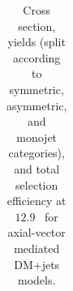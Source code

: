 \begin{table}
{\begin{tabular}{rrlrrrrr}
    \hline\hline
    \end{tabular}
    }
    \caption{Cross section, yields (split according to symmetric, asymmetric, 
        and monojet categories), and total selection efficiency at $12.9$~\ifb 
        for axial-vector mediated DM+jets models.}
    \label{tab:DMAV_yld}
\end{table}

